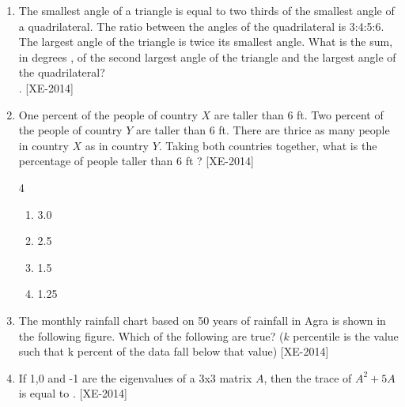 \documentclass[journal]{IEEEtran}
\begin{document}
\begin{enumerate}
\item The smallest angle of a triangle is equal to two thirds of the smallest angle of a quadrilateral. The ratio between the angles of the quadrilateral is 3:4:5:6. The largest angle of the triangle is twice its smallest angle. What is the sum, in degrees , of the second largest angle of the triangle and the largest angle of the quadrilateral?\\. \hfill{[XE-2014]}

\item One percent of the people of country  $X$  are taller than 6 ft.  Two percent of the people of country $Y$ are taller than 6 ft. There are thrice as many people in country $X$ as in country $Y$. Taking both countries together, what is the percentage of people taller than 6 ft ? \hfill{[XE-2014]}
	    
    \begin{multicols}{4} 
    \begin{enumerate}
        \item  3.0
        \item  2.5
        \item 1.5
        \item  1.25
    \end{enumerate}
    \end{multicols}
    
    \item The monthly rainfall chart based on 50 years of rainfall in Agra is shown in the following figure. Which of the following are true? ($k$ percentile is the value such that k percent of the data fall below that value) \hfill{[XE-2014]}

    
\item If 1,0 and -1 are the eigenvalues of a 3x3 matrix $A$, then the trace of $A^2 + 5A$ is equal to \underline{\hspace{2cm}}. \hfill{[XE-2014]}\\


\end{enumerate}
\end{document}
